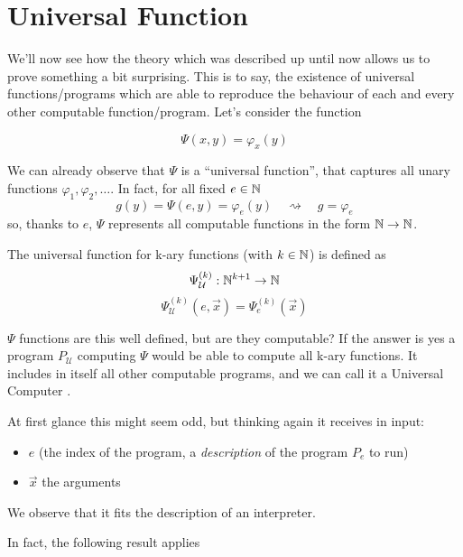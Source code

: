 \chapter {Universal Function}
\newcommand{\Psiex}{\ensuremath{\Psi_{\mathcal{U}}^{(k)} (e, \vec{x})}}
\newcommand{\Psiuex}{\ensuremath{\Psi_e^{(k)} (\vec{x})}}
\newcommand{\univ}{\ensuremath{\Psi_{\mathcal{U}}}}
We'll now see how the theory which was described up until now allows us to
prove something a bit surprising. This is to say, the existence of
universal functions/programs which are able to reproduce the behaviour of each
and every other computable function/program. Let's consider the function

\[
  \Psi(x,y) = \varphi_x(y)
\]

We can already observe that $\Psi$ is a ``universal function'', that
captures all unary functions $\varphi_1, \varphi_2, \dots$. In fact,
for all fixed $e \in \mathbb{N}$
\[
  g(y) = \Psi(e,y) = \varphi_e(y) \quad \rightsquigarrow \quad g = \varphi_e
\]
so, thanks to $e$, $\Psi$ represents all computable functions in the
form $\mathbb{N} \rightarrow \mathbb{N}$.

\begin{definition}
  The universal function for k-ary functions (with $k \in \mathbb{N}$) is
  defined as
  \[
    \univ^{(k)} : \nat^{k+1} \rightarrow \nat
  \]
  \[
    \Psiex = \Psiuex
  \]
\end{definition}
$\Psi$ functions are this well defined, but are they computable? If
the answer is yes a program $P_{\mathcal{U}}$ computing $\Psi$ would
be able to compute all k-ary functions. It includes in itself all
other computable programs, and we can call it a Universal Computer
\cite{davis:2011}.

At first glance this might seem odd, but thinking again it receives in
input:
\begin{itemize}
\item $e$ (the index of the program, a \textit{description} of the
  program $P_e$ to run)
\item $\vec{x}$ the arguments
\end{itemize}
We observe that it fits the description of an interpreter.

In fact, the following result applies

